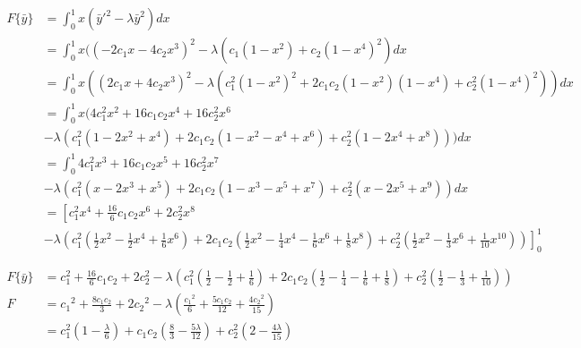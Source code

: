 \documentclass{X:/Documents/Coding/Latex/myassignment}
\begin{document}
\begin{enumerate}
	\begin{align*}
		F\{\bar{y}\} &= \int_0^1 x(\bar{y}'^2 - \lambda \bar{y}^2) dx\\
		&= \int_0^1 x((-2c_1x - 4c_2x^3)^2 - \lambda (c_1(1-x^2) + c_2(1 - x^4)^2) dx\\
		&= \int_0^1 x((2c_1x + 4c_2x^3)^2 - \lambda (c_1^2(1-x^2)^2 + 2c_1c_2(1-x^2)(1-x^4) + c_2^2(1-x^4)^2 )) dx\\
		&= \int_0^1 x(4c_1^2x^2 + 16c_1c_2x^4 + 16c_2^2x^6 \\&- \lambda (c_1^2(1-2x^2 + x^4) +2c_1c_2 (1-x^2 - x^4 + x^6) +  c_2^2(1 - 2x^4 + x^8))) dx\\
		&= \int_0^1 4c_1^2x^3 + 16c_1c_2x^5 + 16c_2^2x^7 \\&- \lambda (c_1^2(x-2x^3 + x^5) +2c_1c_2 (1-x^3 - x^5 + x^7) +  c_2^2(x - 2x^5 + x^9)) dx\\
		&=\left[c_1^2x^4 + \frac{16}{6}c_1c_2x^6 + 2c_2^2x^8 \right.\\&\left.- \lambda (c_1^2(\frac{1}{2}x^2-\frac{1}{2}x^4 + \frac{1}{6}x^6) +2c_1c_2 (\frac{1}{2}x^2-\frac{1}{4}x^4 - \frac{1}{6}x^6 + \frac{1}{8}x^8) +  c_2^2(\frac{1}{2}x^2 - \frac{1}{3}x^6 + \frac{1}{10}x^{10}))\right]_0^1 \\\\
	\end{align*}
	\begin{align*}
	F\{\bar{y}\} &= c_1^2 + \frac{16}{6}c_1c_2 + 2c_2^2 %
	- \lambda (c_1^2(\frac12-\frac{1}{2} + \frac{1}{6}) +2c_1c_2 (\frac{1}{2}-\frac{1}{4} - \frac{1}{6} + \frac{1}{8}) +  c_2^2(\frac{1}{2} - \frac{1}{3} + \frac{1}{10}))\\
		F &=  {c_{1}}^2+\frac{8 c_{1} c_{2}}{3}+2 {c_{2}}^2-\lambda\left(\frac{{c_{1}}^2 }{6}+\frac{5 c_{1} c_{2} }{12}+\frac{4 {c_{2}}^2 }{15}\right)\\
		&=  c_1^2 \left(1 - \frac{\lambda}{6}\right)  + c_1c_2 \left(\frac{8}{3} - \frac{5\lambda}{12}\right) + c_2^2\left(2 - \frac{4\lambda }{15}\right)
	\end{align*}


\end{enumerate}
\end{document}
